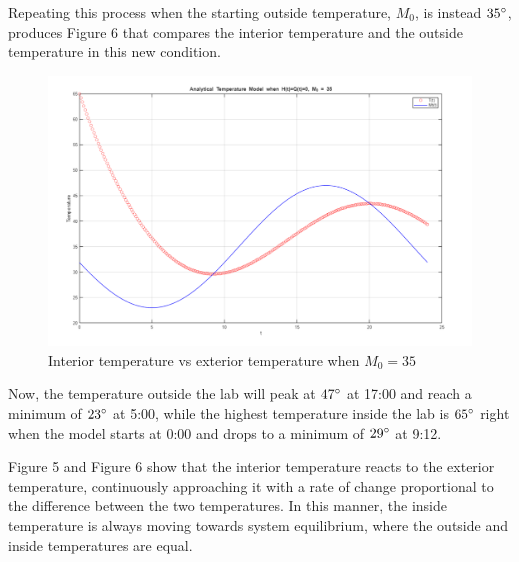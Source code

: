 \documentclass[12pt]{article}
\begin{document}
Repeating this process when the starting outside temperature, $M_0$, is instead $35\degree$, produces Figure 6 that compares the interior temperature and the outside temperature in this new condition. 
\begin{figure}[H]
    \centering
    \includegraphics[width=0.75\linewidth]{images/Task_C2.png}
    \caption{Interior temperature vs exterior temperature when $M_0=35$}
    \label{fig:placeholder}
\end{figure}
Now, the temperature outside the lab will peak at $47\degree$ at 17:00 and reach a minimum of $23\degree$ at 5:00, while the highest temperature inside the lab is $65\degree$ right when the model starts at 0:00 and drops to a minimum of $29\degree$ at 9:12.

Figure 5 and Figure 6 show that the interior temperature reacts to the exterior temperature, continuously approaching it with a rate of change proportional to the difference between the two temperatures. In this manner, the inside temperature is always moving towards system equilibrium, where the outside and inside temperatures are equal. 
\end{document}
